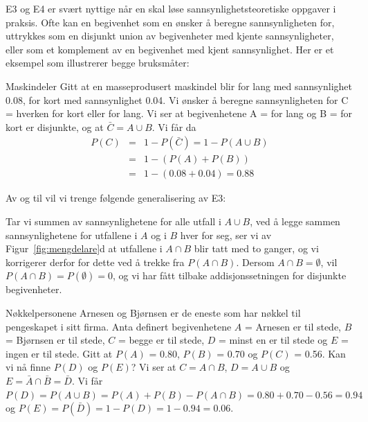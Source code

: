      E3 og E4 er svært nyttige når en skal løse
 sannsynlighetsteoretiske oppgaver i praksis. Ofte kan en
begivenhet som en ønsker å beregne sannsynligheten for, uttrykkes
som en disjunkt union av begivenheter med kjente sannsynligheter,
eller som et komplement av en begivenhet med kjent sannsynlighet.
Her er et eksempel som illustrerer begge bruksmåter: \\

\begin{eksempel}{Maskindeler}
Gitt at en masseprodusert maskindel blir for lang med
sannsynlighet 0.08, for kort med sannsynlighet 0.04. Vi ønsker å
beregne sannsynligheten for C = hverken for kort eller for lang.
Vi ser at begivenhetene A = for lang og B = for kort er
disjunkte, og at $\bar{C} = A \cup B$. Vi får da
\begin{eqnarray*}
    P(C)& = & 1 -P(\bar{C}) = 1-P(A \cup B) \\
        & = & 1 -(P(A) + P(B)) \\
        & = & 1 -(0.08 + 0.04) = 0.88 
\end{eqnarray*}
\end{eksempel}
\noindent Av og til vil vi trenge følgende generalisering av E3: \\
\begin{center}  \end{center}
\noindent Tar vi summen av sannsynlighetene for alle utfall i $A \cup B$,
ved å legge sammen sannsynlighetene for utfallene i $A$ og i $B$
hver for seg, ser vi av Figur~\ref{fig:mengdelare}d at utfallene i $A \cap B$ blir
tatt med to ganger, og vi korrigerer derfor for dette ved å
trekke fra $P(A \cap B)$. Dersom $A \cap B = \emptyset$, vil $P(A \cap B)
= P(\emptyset) =0$, og vi har fått tilbake addisjonssetningen for
disjunkte begivenheter. \\

\begin{eksempel}{Nøkkelpersonene}
Arnesen og Bjørnsen er de eneste som har nøkkel til pengeskapet i
sitt firma. Anta definert begivenhetene $A$ = Arnesen er til stede,
$B$ = Bjørnsen er til stede, $C$ = begge er til stede, $D$ = minst en
er til stede og $E$ = ingen er til stede. Gitt at $P(A)$ = 0.80,
 $P(B)$ = 0.70 og $P(C)$ = 0.56. Kan vi nå finne $P(D)$ og $P(E)$?
Vi ser at $C = A \cap B$, $D = A \cup B$ og $E =\bar{A}\cap \bar{B} = \bar{D}$.
 Vi får $P(D) = P(A \cup B) = P(A) + P(B) -P(A \cap B) = 0.80 + 0.70
- 0.56 = 0.94$  og  $P(E) = P(\bar{D}) = 1 - P(D) = 1 - 0.94 = 0.06$.
\end{eksempel}

